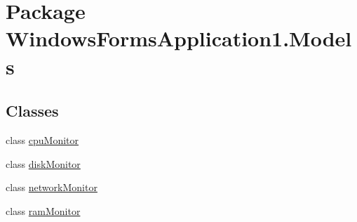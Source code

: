 \hypertarget{namespace_windows_forms_application1_1_1_models}{}\section{Package Windows\+Forms\+Application1.\+Models}
\label{namespace_windows_forms_application1_1_1_models}
\subsection*{Classes}
\begin{DoxyCompactItemize}
\item 
class \hyperlink{class_windows_forms_application1_1_1_models_1_1cpu_monitor}{cpu\+Monitor}
\item 
class \hyperlink{class_windows_forms_application1_1_1_models_1_1disk_monitor}{disk\+Monitor}
\item 
class \hyperlink{class_windows_forms_application1_1_1_models_1_1network_monitor}{network\+Monitor}
\item 
class \hyperlink{class_windows_forms_application1_1_1_models_1_1ram_monitor}{ram\+Monitor}
\end{DoxyCompactItemize}
